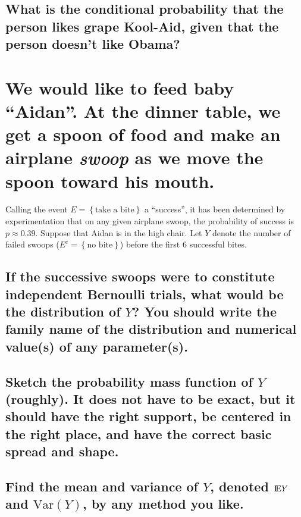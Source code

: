\documentclass[11pt]{article}
\begin{document}
\subsection{What is the conditional probability that the person likes  grape Kool-Aid, given that the person  doesn't like Obama?}
\label{sec-1_3}
\section{We would like to feed baby ``Aidan''. At the dinner table, we get a spoon of food and make an airplane \emph{swoop} as we move the spoon toward his mouth.}
\label{sec-2}



Calling the event \( E=\left\{ \mbox{take a bite}\right\} \) a ``success'', it has been determined by experimentation that on any given airplane swoop, the probability of success is \(p \approx  0.39\). Suppose that Aidan is in the high chair. Let $Y$ denote the number of failed swoops (\(E^{c}=\left\{ \mbox{no bite}\right\}\)) before the first  6 successful bites.
\subsection{If the successive swoops were to constitute independent Bernoulli trials, what would be the distribution of \(Y\)? You should write the family name of the distribution and numerical value(s) of any parameter(s).}
\label{sec-2_1}
\subsection{Sketch the probability mass function of $Y$ (roughly). It does not have to be exact, but it should have the right support, be centered in the right place, and have the correct basic spread and shape.}
\label{sec-2_2}
\subsection{Find the mean and variance of $Y$, denoted $\mathrm{I\! E} Y$ and $\mathrm{Var}(Y)$, by any method you like.}
\label{sec-2_3}
\end{document}
